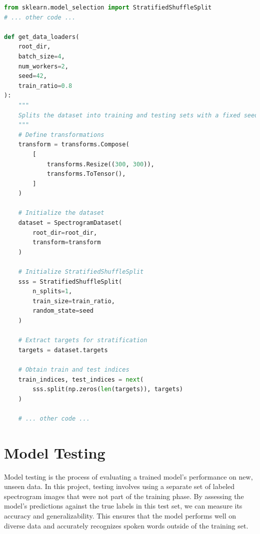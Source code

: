 \documentclass[12pt]{article}
\begin{document}
\newpage

\begin{lstlisting}[language=Python, caption=Dataset Preparation and Splitting, label={lst:main_training_function}]
from sklearn.model_selection import StratifiedShuffleSplit
# ... other code ...

def get_data_loaders(
    root_dir,
    batch_size=4,
    num_workers=2,
    seed=42,
    train_ratio=0.8
):
    """
    Splits the dataset into training and testing sets with a fixed seed and ensures that each class is equally represented in both sets (stratified split).
    """
    # Define transformations
    transform = transforms.Compose(
        [
            transforms.Resize((300, 300)),
            transforms.ToTensor(),
        ]
    )

    # Initialize the dataset
    dataset = SpectrogramDataset(
        root_dir=root_dir,
        transform=transform
    )

    # Initialize StratifiedShuffleSplit
    sss = StratifiedShuffleSplit(
        n_splits=1,
        train_size=train_ratio,
        random_state=seed
    )

    # Extract targets for stratification
    targets = dataset.targets

    # Obtain train and test indices
    train_indices, test_indices = next(
        sss.split(np.zeros(len(targets)), targets)
    )

    # ... other code ...
\end{lstlisting}


\newpage




\section{Model Testing}

Model testing is the process of evaluating a trained model's performance on new, unseen data. In this project, testing involves using a separate set of labeled spectrogram images that were not part of the training phase. By assessing the model’s predictions against the true labels in this test set, we can measure its accuracy and generalizability. This ensures that the model performs well on diverse data and accurately recognizes spoken words outside of the training set.
\end{document}
